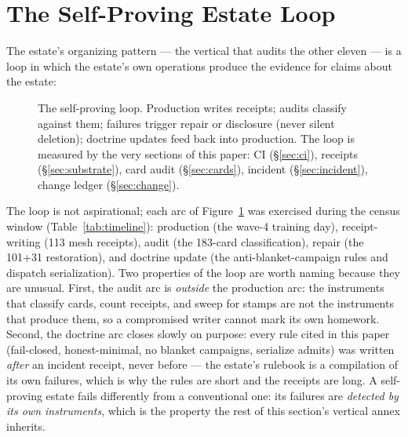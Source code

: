 
\section{The Self-Proving Estate Loop}
\label{sec:loop}

The estate's organizing pattern --- the vertical that audits the other eleven --- is a loop in which the estate's own operations produce the evidence for claims about the estate:

\begin{figure}[htbp]
\centering
{}
\caption{The self-proving loop. Production writes receipts; audits classify against them; failures trigger repair or disclosure (never silent deletion); doctrine updates feed back into production. The loop is measured by the very sections of this paper: CI (\S\ref{sec:ci}), receipts (\S\ref{sec:substrate}), card audit (\S\ref{sec:cards}), incident (\S\ref{sec:incident}), change ledger (\S\ref{sec:change}).}
\label{fig:loop}
\end{figure}

The loop is not aspirational; each arc of Figure~\ref{fig:loop} was exercised during the census window (Table~\ref{tab:timeline}): production (the wave-4 training day), receipt-writing (113 mesh receipts), audit (the 183-card classification), repair (the 101+31 restoration), and doctrine update (the anti-blanket-campaign rules and dispatch serialization). Two properties of the loop are worth naming because they are unusual. First, the audit arc is \emph{outside} the production arc: the instruments that classify cards, count receipts, and sweep for stamps are not the instruments that produce them, so a compromised writer cannot mark its own homework. Second, the doctrine arc closes slowly on purpose: every rule cited in this paper (fail-closed, honest-minimal, no blanket campaigns, serialize admits) was written \emph{after} an incident receipt, never before --- the estate's rulebook is a compilation of its own failures, which is why the rules are short and the receipts are long. A self-proving estate fails differently from a conventional one: its failures are \emph{detected by its own instruments}, which is the property the rest of this section's vertical annex inherits.

